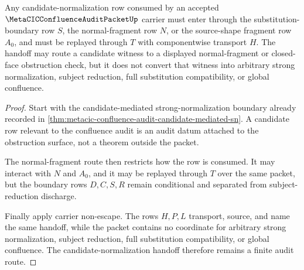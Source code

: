 \begin{theorem}
\label{thm:metacic-confluence-audit-candidate-normalization-handoff}
Any candidate-normalization row consumed by an accepted $\MetaCICConfluenceAuditPacketUp$ carrier must enter through the substitution-boundary row $S$, the normal-fragment row $N$, or the source-shape fragment row $A_0$, and must be replayed through $T$ with componentwise transport $H$. The handoff may route a candidate witness to a displayed normal-fragment or closed-face obstruction check, but it does not convert that witness into arbitrary strong normalization, subject reduction, full substitution compatibility, or global confluence.
\end{theorem}
\begin{proof}
Start with the candidate-mediated strong-normalization boundary already recorded in \autoref{thm:metacic-confluence-audit-candidate-mediated-sn}. A candidate row relevant to the confluence audit is an audit datum attached to the obstruction surface, not a theorem outside the packet.

The normal-fragment route then restricts how the row is consumed. It may interact with $N$ and $A_0$, and it may be replayed through $T$ over the same packet, but the boundary rows $D,C,S,R$ remain conditional and separated from subject-reduction discharge.

Finally apply carrier non-escape. The rows $H,P,L$ transport, source, and name the same handoff, while the packet contains no coordinate for arbitrary strong normalization, subject reduction, full substitution compatibility, or global confluence. The candidate-normalization handoff therefore remains a finite audit route.
\end{proof}

